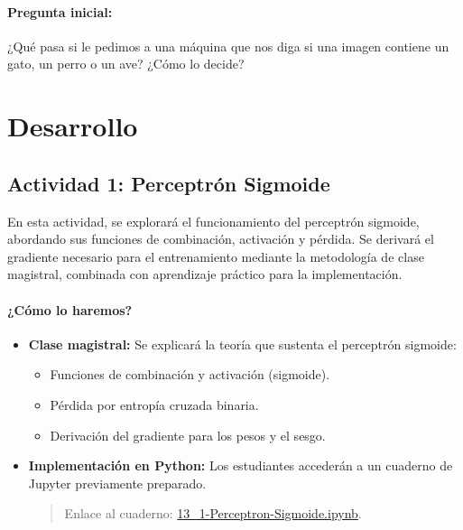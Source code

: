 \documentclass[a4,11pt]{aleph-notas}
\begin{document}
\paragraph{Pregunta inicial:} 
¿Qué pasa si le pedimos a una máquina que nos diga si una imagen contiene un gato, un perro o un ave? ¿Cómo lo decide?


\section*{Desarrollo}

\subsection*{Actividad 1: Perceptrón Sigmoide}

En esta actividad, se explorará el funcionamiento del perceptrón sigmoide, abordando sus funciones de combinación, activación y pérdida. Se derivará el gradiente necesario para el entrenamiento mediante la metodología de clase magistral, combinada con aprendizaje práctico para la implementación.

\paragraph{¿Cómo lo haremos?}  
\begin{itemize}[leftmargin=*]
    \item \textbf{Clase magistral:} Se explicará la teoría que sustenta el perceptrón sigmoide:
    \begin{itemize}
        \item Funciones de combinación y activación (sigmoide).
        \item Pérdida por entropía cruzada binaria.
        \item Derivación del gradiente para los pesos y el sesgo.
    \end{itemize}
    \item \textbf{Implementación en Python:} Los estudiantes accederán a un cuaderno de Jupyter previamente preparado.
    \begin{quote}
        Enlace al cuaderno: \href{https://colab.research.google.com/github/andres-merino/AprendizajeAutomaticoInicial-05-N0105/blob/main/2-Notebooks/13_1-Perceptron-Sigmoide.ipynb}{13\_1-Perceptron-Sigmoide.ipynb}.
    \end{quote}
\end{itemize}
\end{document}
